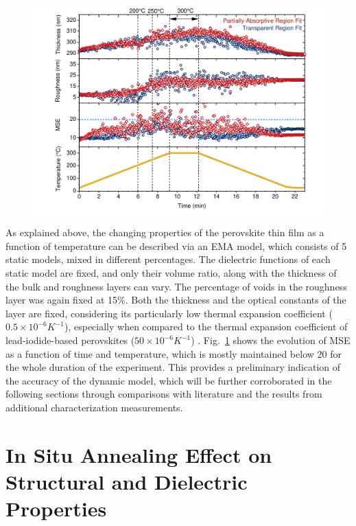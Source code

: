 \begin{figure}[htbp]
  \centering
  \medskip
  \includegraphics[width=.99\textwidth]{chapters/ellipsometry/image/Roughness_Thickness.pdf}
  \caption{}
  \label{fig:ellipsometry:roughness_thickness}
\end{figure}


As explained above, the changing properties of the perovskite thin film as a function of temperature can be described via an EMA model, which consists of 5 static models, mixed in different percentages. The dielectric functions of each static model are fixed, and only their volume ratio, along with the thickness of the bulk and roughness layers can vary. The percentage of voids in the roughness layer was again fixed at 15\%. Both the thickness and the optical constants of the  layer are fixed, considering its particularly low thermal expansion coefficient ($0.5 \times 10^{-6} K^{-1}$), especially when compared to the thermal expansion coefficient of lead-iodide-based perovskites ($50\times10^{-6} K^{-1}$) \cite{Steele2019ThermalFilms}. Fig.~\ref{fig:ellipsometry:roughness_thickness} shows the evolution of MSE as a function of time and temperature, which is mostly maintained below 20 for the whole duration of the experiment. This provides a preliminary indication of the accuracy of the dynamic model, which will be further corroborated in the following sections through comparisons with literature and the results from additional characterization measurements. 

\section{In Situ Annealing Effect on Structural and Dielectric Properties}

